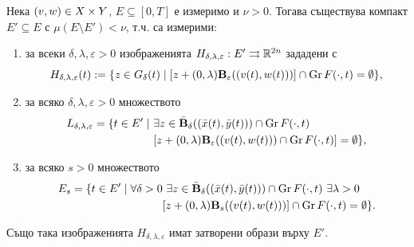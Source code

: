 \begin{lemma} \label{L2}
    Нека $(v,w)\in X\times Y$, $E\subseteq [0,T]$ е измеримо и $\nu > 0$. Тогава съществува компакт $E'\subseteq E$ с $\mu(E\setminus E') < \nu$, т.ч. са измерими:
    \begin{enumerate}
        \item за всеки $\delta,\lambda,\varepsilon > 0$ изображенията $H_{\delta,\lambda,\varepsilon}:E'\rightrightarrows \mathbb{R}^{2n}$ зададени с
            \[
                H_{\delta,\lambda,\varepsilon}(t) := \{z\in G_{\delta}(t) \mid [z + (0,\lambda)\textbf{B}_{\varepsilon}((v(t),w(t)))]\cap\operatorname{Gr} F(\cdot, t) = \emptyset\},
            \]
        \item за всяко $\delta,\lambda,\varepsilon>0$ множеството
            \begin{align*}
                L_{\delta,\lambda,\varepsilon}=\{t\in E' \mid\ &\exists z\in \clBall_{\delta}(\Pointt)\cap\Gr\\
                   &[z + (0, \lambda)\Ball_{\varepsilon}(\Vect)\cap\Gr] = \emptyset\},
            \end{align*}
        \item за всяко $s>0$ множеството
            \begin{align*}
                E_s = \{t\in E' \mid \forall \delta > 0&\ \exists z \in \bar{\textbf{B}}_{\delta}((\bar{x}(t),\bar{y}(t)))\cap\operatorname{Gr} F(\cdot, t)\ \exists \lambda > 0\\
                 &[z + (0, \lambda)\textbf{B}_s((v(t),w(t)))]\cap\operatorname{Gr} F(\cdot, t) = \emptyset\}.
                \end{align*}
    \end{enumerate}
    Също така изображенията $H_{\delta,\lambda,\varepsilon}$ имат затворени образи върху $E'$.
\end{lemma}
